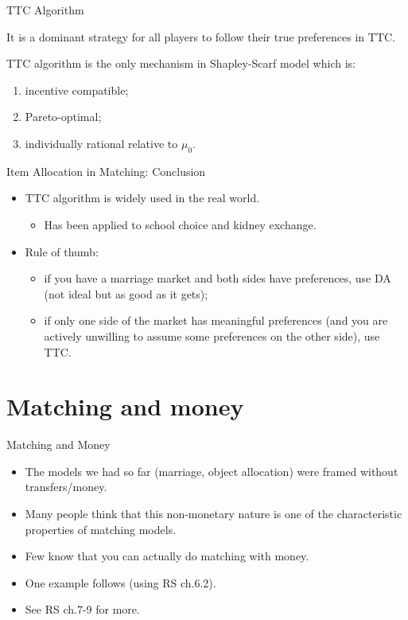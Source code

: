\documentclass[english,10pt
,aspectratio=169
]{beamer}
\begin{document}
\begin{frame}{TTC Algorithm}
\begin{theorem}
	It is a dominant strategy for all players to follow their true preferences in TTC.
\end{theorem}
\begin{theorem}
	TTC algorithm is the only mechanism in Shapley-Scarf model which is:
	\begin{enumerate}
		\item incentive compatible;
		\item Pareto-optimal;
		\item individually rational relative to $\mu_0$.
	\end{enumerate}
\end{theorem}
\end{frame}


\begin{frame}{Item Allocation in Matching: Conclusion}
\begin{itemize}
	\item TTC algorithm is widely used in the real world.
	\begin{itemize}
		\item Has been applied to school choice and kidney exchange.
	\end{itemize}
	\item Rule of thumb:
	\begin{itemize}
		\item if you have a marriage market and both sides have preferences, use DA (not ideal but as good as it gets);
		\item if only one side of the market has meaningful preferences (and you are actively unwilling to assume some preferences on the other side), use TTC.
	\end{itemize}
\end{itemize}
\end{frame}



\section{Matching and money}

\begin{frame}{Matching and Money}
\begin{itemize}
	\item The models we had so far (marriage, object allocation) were framed without transfers/money.
	\item Many people think that this non-monetary nature is one of the characteristic properties of matching models.
	\item Few know that you can actually do matching with money.
	\item One example follows (using RS ch.6.2).
	\item See RS ch.7-9 for more.
\end{itemize}
\end{frame}
\end{document}
